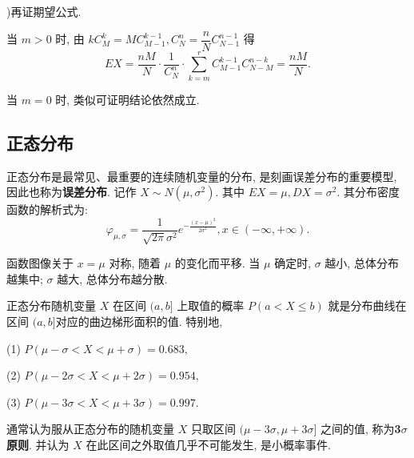 \documentclass[titlepage]{ctexart}
\begin{document}
)再证期望公式.

当 $m > 0$ 时, 由 $kC_M^k = MC_{M-1}^{k-1}, C_N^n = \dfrac{n}{N}C_{N-1}^{n-1}$ 得
\[
EX = \frac{nM}{N} \cdot \frac{1}{C_N^n} \cdot \sum_{k=m}^{r}C_{M-1}^{k-1}C_{N-M}^{n-k} = \frac{nM}{N}.
\]

当 $m = 0$ 时, 类似可证明结论依然成立. 

\subsection{正态分布}

正态分布是最常见、最重要的连续随机变量的分布, 是刻画误差分布的重要模型, 因此也称为\textbf{误差分布}. 记作 $X \sim N(\mu, \sigma^2)$.
其中 $EX = \mu, DX = \sigma^2$. 其分布密度函数的解析式为:
\[
\varphi_{\mu, \sigma} = \frac{1}{\sqrt{2\pi}\sigma^2}e^{-\frac{(x-\mu)^2}{2\sigma^2}}, x \in (-\infty, +\infty).
\]

函数图像关于 $x = \mu$ 对称, 随着 $\mu$ 的变化而平移. 当 $\mu$ 确定时, $\sigma$ 越小, 总体分布越集中; $\sigma$ 越大, 总体分布越分散.

正态分布随机变量 $X$ 在区间 $(a, b]$ 上取值的概率 $P(a < X \leqslant b)$ 就是分布曲线在区间 $(a, b]$对应的曲边梯形面积的值. 特别地, 

(1) $P(\mu - \sigma < X < \mu + \sigma) = 0.683,$

(2) $P(\mu - 2\sigma < X < \mu + 2\sigma) = 0.954,$

(3) $P(\mu - 3\sigma < X < \mu + 3\sigma) = 0.997.$

通常认为服从正态分布的随机变量 $X$ 只取区间 $(\mu - 3\sigma,\mu + 3\sigma]$ 之间的值, 称为\textbf{3$\sigma$原则}. 
并认为 $X$ 在此区间之外取值几乎不可能发生, 是小概率事件.
\end{document}
